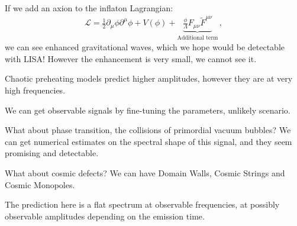 \documentclass[main.tex]{subfiles}
\begin{document}
If we add an axion to the inflaton Lagrangian: 
%
\begin{align}
\mathcal{L} = \frac{1}{2} \partial_{\mu } \phi \partial^{\mu }\phi + V(\phi ) + \underbrace{\frac{\phi}{\Lambda } F_{\mu \nu } \widetilde{F}^{\mu \nu }}_{\text{Additional term}} 
\,,
\end{align}
%
we can see enhanced gravitational waves, which we hope would be detectable with LISA! However the enhancement is very small, we cannot see it. 

Chaotic preheating models predict higher amplitudes, however they are at very high frequencies. 

We can get observable signals by fine-tuning the parameters, unlikely scenario. 

What about phase transition, the collisions of primordial vacuum bubbles? We can get numerical estimates on the spectral shape of this signal, and they seem promising and detectable. 

What about cosmic defects? We can have Domain Walls, Cosmic Strings and Cosmic Monopoles. 

The prediction here is a flat spectrum at observable frequencies, at possibly observable amplitudes depending on the emission time. 
\end{document}

